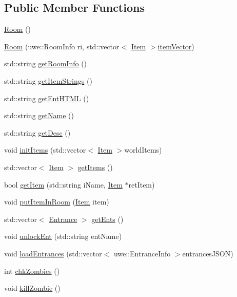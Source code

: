 \subsection*{Public Member Functions}
\begin{DoxyCompactItemize}
\item 
\hyperlink{class_room_ac6ef93a7d9c3e1d624e025058d5f16ff}{Room} ()
\item 
\hyperlink{class_room_a96f197f3053dfaa506cde4b80978d4bf}{Room} (uwe\+::\+Room\+Info ri, std\+::vector$<$ \hyperlink{class_item}{Item} $>$\hyperlink{class_room_a21e907fa249c8248845a4e001c7b572a}{item\+Vector})
\item 
std\+::string \hyperlink{class_room_a51db5005d72bcaabd2f13b52eb740e30}{get\+Room\+Info} ()
\item 
std\+::string \hyperlink{class_room_a59f42b1d74464cd62fb9691ed2be0c85}{get\+Item\+Strings} ()
\item 
std\+::string \hyperlink{class_room_a75271a20c610a24bfa275953c45dae61}{get\+Ent\+H\+T\+ML} ()
\item 
std\+::string \hyperlink{class_room_ae6a3be5861b657a2cbbada8e67ab7fde}{get\+Name} ()
\item 
std\+::string \hyperlink{class_room_a49b28c0297cd75f6bb94b861dafbb0bd}{get\+Desc} ()
\item 
void \hyperlink{class_room_a7a2ed3178aed3660121882858f269a10}{init\+Items} (std\+::vector$<$ \hyperlink{class_item}{Item} $>$world\+Items)
\item 
std\+::vector$<$ \hyperlink{class_item}{Item} $>$ \hyperlink{class_room_aff3135c3732758a8e176fe5161a193f2}{get\+Items} ()
\item 
bool \hyperlink{class_room_ab838a8ed7f67e2b438a7d96ffbbe6961}{get\+Item} (std\+::string i\+Name, \hyperlink{class_item}{Item} $\ast$ret\+Item)
\item 
void \hyperlink{class_room_a0aefeb033bb51709bc72fe47574568ca}{put\+Item\+In\+Room} (\hyperlink{class_item}{Item} item)
\item 
std\+::vector$<$ \hyperlink{class_entrance}{Entrance} $>$ \hyperlink{class_room_ac4233ee265acfda90b9f159219553e36}{get\+Ents} ()
\item 
void \hyperlink{class_room_a1328ddc5bd5957738335f7c05f21959f}{unlock\+Ent} (std\+::string ent\+Name)
\item 
void \hyperlink{class_room_ae6c0cdda79ffe2c9ce43b816f137a99d}{load\+Entrances} (std\+::vector$<$ uwe\+::\+Entrance\+Info $>$entrances\+J\+S\+ON)
\item 
int \hyperlink{class_room_a9995dfb547b839c817a3f1b107ae3591}{chk\+Zombies} ()
\item 
void \hyperlink{class_room_aaeaf156da5e9ae2980438d495dbb5420}{kill\+Zombie} ()
\end{DoxyCompactItemize}
